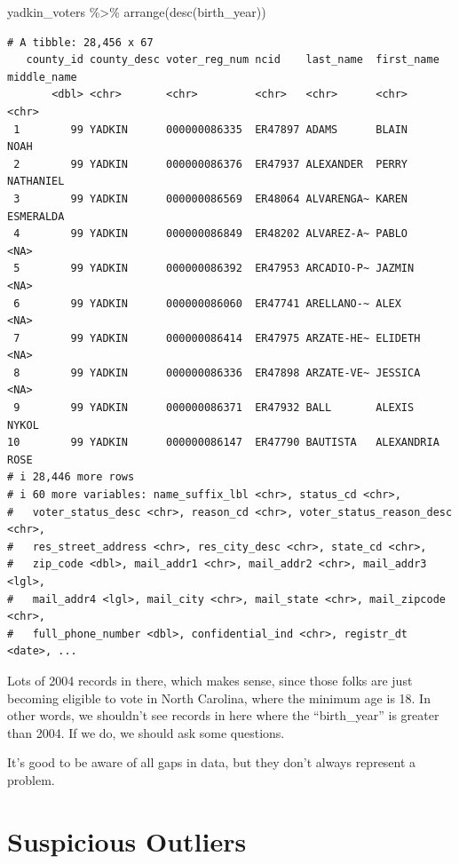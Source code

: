 \documentclass[
  letterpaper,
  DIV=11,
  numbers=noendperiod]{scrreprt}
\newenvironment{Shaded}{\begin{snugshade}}{\end{snugshade}}
\newcommand{\FunctionTok}[1]{\textcolor[rgb]{0.28,0.35,0.67}{#1}}
\newcommand{\NormalTok}[1]{\textcolor[rgb]{0.00,0.23,0.31}{#1}}
\newcommand{\SpecialCharTok}[1]{\textcolor[rgb]{0.37,0.37,0.37}{#1}}
\begin{document}
\begin{Shaded}
\begin{Highlighting}[]
\NormalTok{yadkin\_voters }\SpecialCharTok{\%\textgreater{}\%} \FunctionTok{arrange}\NormalTok{(}\FunctionTok{desc}\NormalTok{(birth\_year))}
\end{Highlighting}
\end{Shaded}

\begin{verbatim}
# A tibble: 28,456 x 67
   county_id county_desc voter_reg_num ncid    last_name  first_name middle_name
       <dbl> <chr>       <chr>         <chr>   <chr>      <chr>      <chr>      
 1        99 YADKIN      000000086335  ER47897 ADAMS      BLAIN      NOAH       
 2        99 YADKIN      000000086376  ER47937 ALEXANDER  PERRY      NATHANIEL  
 3        99 YADKIN      000000086569  ER48064 ALVARENGA~ KAREN      ESMERALDA  
 4        99 YADKIN      000000086849  ER48202 ALVAREZ-A~ PABLO      <NA>       
 5        99 YADKIN      000000086392  ER47953 ARCADIO-P~ JAZMIN     <NA>       
 6        99 YADKIN      000000086060  ER47741 ARELLANO-~ ALEX       <NA>       
 7        99 YADKIN      000000086414  ER47975 ARZATE-HE~ ELIDETH    <NA>       
 8        99 YADKIN      000000086336  ER47898 ARZATE-VE~ JESSICA    <NA>       
 9        99 YADKIN      000000086371  ER47932 BALL       ALEXIS     NYKOL      
10        99 YADKIN      000000086147  ER47790 BAUTISTA   ALEXANDRIA ROSE       
# i 28,446 more rows
# i 60 more variables: name_suffix_lbl <chr>, status_cd <chr>,
#   voter_status_desc <chr>, reason_cd <chr>, voter_status_reason_desc <chr>,
#   res_street_address <chr>, res_city_desc <chr>, state_cd <chr>,
#   zip_code <dbl>, mail_addr1 <chr>, mail_addr2 <chr>, mail_addr3 <lgl>,
#   mail_addr4 <lgl>, mail_city <chr>, mail_state <chr>, mail_zipcode <chr>,
#   full_phone_number <dbl>, confidential_ind <chr>, registr_dt <date>, ...
\end{verbatim}

Lots of 2004 records in there, which makes sense, since those folks are
just becoming eligible to vote in North Carolina, where the minimum age
is 18. In other words, we shouldn't see records in here where the
``birth\_year'' is greater than 2004. If we do, we should ask some
questions.

It's good to be aware of all gaps in data, but they don't always
represent a problem.

\hypertarget{suspicious-outliers}{%
\section{Suspicious Outliers}\label{suspicious-outliers}}
\end{document}
